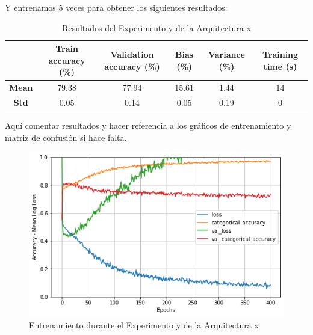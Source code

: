 \documentclass{article}
\begin{document}
			Y entrenamos 5 veces para obtener los siguientes resultados:
			\begin{table}[!h]
				\begin{center}
					\begin{tabular}{ c | c | c | c | c | c |}
						\ & \textbf{Train accuracy (\%)} & \textbf{Validation accuracy (\%)} & \textbf{Bias (\%)} & \textbf{Variance (\%)} & \textbf{Training time (s)} \\ \hline
						\textbf{Mean} & 79.38 & 77.94 & 15.61 & 1.44 & 14\\ \hline
						\textbf{Std} & 0.05 & 0.14 & 0.05 & 0.19 & 0 \\ \hline
					\end{tabular}
					\caption{Resultados del Experimento y de la Arquitectura x}
					\label{tab:res-n-ax-ey}
				\end{center}
			\end{table}
		    
		    Aqu\'i comentar resultados y hacer referencia a los gr\'aficos de entrenamiento y matriz de confusi\'on si hace falta.
		    
			\begin{figure}[!h]
				\begin{center}
					\includegraphics[scale=0.5]{n-tr-ax-ey.png}		
					\caption{Entrenamiento durante el Experimento y de la Arquitectura x}	
					\label{n-tr-a4-e3}
				\end{center}
			\end{figure}
			
\end{document}
